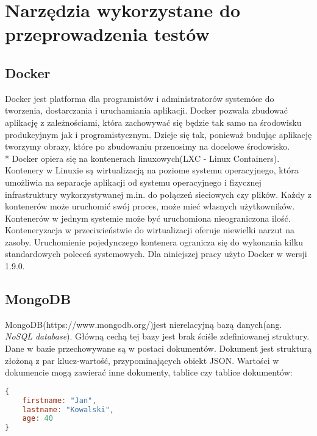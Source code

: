 \chapter{Narzędzia wykorzystane do przeprowadzenia testów}

\section{Docker}
Docker jest platforma dla programistów i administratorów systemóœ do tworzenia, dostarczania i uruchamiania aplikacji. Docker pozwala zbudować aplikację z zależnościami, która zachowywać się będzie tak samo na środowisku produkcyjnym jak i programistycznym. Dzieje się tak, ponieważ budując aplikację tworzymy obrazy, które po zbudowaniu przenosimy na docelowe środowisko.\\*
Docker opiera się na kontenerach linuxowych(LXC - Linux Containers). Kontenery w Linuxie są wirtualizacją na poziome systemu operacyjnego, która umożliwia na separacje aplikacji od systemu operacyjnego i fizycznej infrastruktury wykorzystywanej m.in. do połączeń sieciowych czy plików. Każdy z kontenerów może uruchomić swój proces, może mieć własnych użytkowników. Kontenerów w jednym systemie może być uruchomiona nieograniczona ilość. Konteneryzacja w przeciwieństwie do wirtualizacji  oferuje niewielki narzut na zasoby. Uruchomienie pojedynczego kontenera ogranicza się do wykonania kilku standardowych poleceń systemowych. 
Dla niniejszej pracy użyto Docker w wersji 1.9.0.

\section{MongoDB}
MongoDB(https://www.mongodb.org/)jest nierelacyjną bazą danych(ang. \textsl{NoSQL database}). Główną cechą tej bazy jest brak ściśle zdefiniowanej struktury. Dane w bazie przechowywane są w postaci dokumentów. Dokument jest strukturą złożoną z par klucz-wartość, przypominających obiekt JSON. Wartości w dokumencie mogą zawierać inne dokumenty, tablice czy tablice dokumentów:
\begin{lstlisting}[language=JavaScript,caption=Przykład dokumentu w formacie JSON]
{
    firstname: "Jan",
    lastname: "Kowalski",
    age: 40
}
\end{lstlisting}


